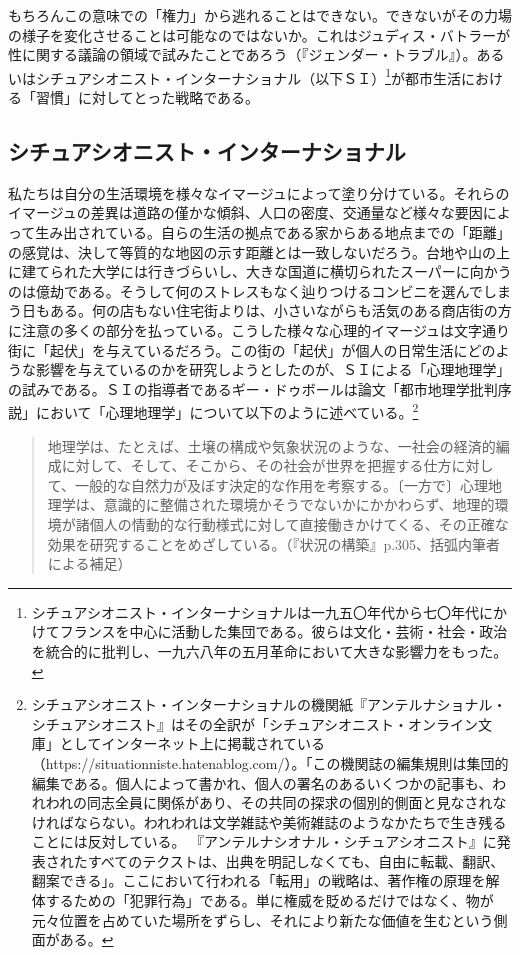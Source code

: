 \documentclass[b5j,twoside,twocolumn]{utarticle}
\begin{document}
もちろんこの意味での「権力」から逃れることはできない。できないがその力場の様子を変化させることは可能なのではないか。これはジュディス・バトラーが性に関する議論の領域で試みたことであろう（『ジェンダー・トラブル』）。あるいはシチュアシオニスト・インターナショナル（以下ＳＩ）\footnote{シチュアシオニスト・インターナショナルは一九五〇年代から七〇年代にかけてフランスを中心に活動した集団である。彼らは文化・芸術・社会・政治を統合的に批判し、一九六八年の五月革命において大きな影響力をもった。}が都市生活における「習慣」に対してとった戦略である。
\subsection{シチュアシオニスト・インターナショナル}
私たちは自分の生活環境を様々なイマージュによって塗り分けている。それらのイマージュの差異は道路の僅かな傾斜、人口の密度、交通量など様々な要因によって生み出されている。自らの生活の拠点である家からある地点までの「距離」の感覚は、決して等質的な地図の示す距離とは一致しないだろう。台地や山の上に建てられた大学には行きづらいし、大きな国道に横切られたスーパーに向かうのは億劫である。そうして何のストレスもなく辿りつけるコンビニを選んでしまう日もある。何の店もない住宅街よりは、小さいながらも活気のある商店街の方に注意の多くの部分を払っている。こうした様々な心理的イマージュは文字通り街に「起伏」を与えているだろう。この街の「起伏」が個人の日常生活にどのような影響を与えているのかを研究しようとしたのが、ＳＩによる「心理地理学」の試みである。ＳＩの指導者であるギー・ドゥボールは論文「都市地理学批判序説」において「心理地理学」について以下のように述べている。\footnote{シチュアシオニスト・インターナショナルの機関紙『アンテルナショナル・シチュアシオニスト』はその全訳が「シチュアシオニスト・オンライン文庫」としてインターネット上に掲載されている（https://situationniste.hatenablog.com/）。「この機関誌の編集規則は集団的編集である。個人によって書かれ、個人の署名のあるいくつかの記事も、われわれの同志全員に関係があり、その共同の探求の個別的側面と見なされなければならない。われわれは文学雑誌や美術雑誌のようなかたちで生き残ることには反対している。 『アンテルナシオナル・シチュアシオニスト』に発表されたすべてのテクストは、出典を明記しなくても、自由に転載、翻訳、翻案できる」。ここにおいて行われる「転用」の戦略は、著作権の原理を解体するための「犯罪行為」である。単に権威を貶めるだけではなく、物が元々位置を占めていた場所をずらし、それにより新たな価値を生むという側面がある。
}
\begin{quote}
地理学は、たとえば、土壌の構成や気象状況のような、一社会の経済的編成に対して、そして、そこから、その社会が世界を把握する仕方に対して、一般的な自然力が及ぼす決定的な作用を考察する。〔一方で〕心理地理学は、意識的に整備された環境かそうでないかにかかわらず、地理的環境が諸個人の情動的な行動様式に対して直接働きかけてくる、その正確な効果を研究することをめざしている。（『状況の構築』p.305、括弧内筆者による補足）
\end{quote}
\end{document}
